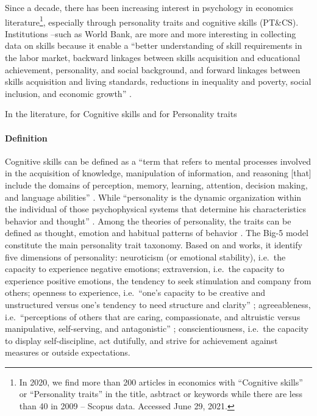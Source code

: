 \documentclass[a4paper, 11pt, onecolumn]{article}
\newcommand{\ie}{i.e.}
\begin{document}
Since a decade, there has been increasing interest in psychology in economics literature\footnote{In 2020, we find more than 200 articles in economics with ``Cognitive skills'' or ``Personality traits'' in the title, asbtract or keywords while there are less than 40 in 2009 -- Scopus data. Accessed June 29, 2021.}, especially through personality traits and cognitive skills (PT\&CS).
Institutions --such as World Bank, are more and more interesting in collecting data on skills because it enable a ``better understanding of skill requirements in the labor market, backward linkages between skills acquisition and educational achievement, personality, and social background, and forward linkages between skills acquisition and living standards, reductions in inequality and poverty, social inclusion, and economic growth'' \citep{STEP2014}.

In the literature, \cite{Hanushek2008} for Cognitive skills and \cite{Almlund2011, Borghans2008, Heckman2011} for Personality traits

\paragraph*{Definition}
Cognitive skills can be defined as a ``term that refers to mental processes involved in the acquisition of knowledge, manipulation of information, and reasoning [that] include the domains of perception, memory, learning, attention, decision making, and language abilities'' \citep{Kiely2014}.
While ``personality is the dynamic organization within the individual of those psychophysical systems that determine his characteristics behavior and thought'' \citep{Allport1961}.
Among the theories of personality, the traits can be defined as thought, emotion and habitual patterns of behavior \citep{Kassin2003}.
The Big-5 model constitute the main personality trait taxonomy.
Based on \cite{Goldberg1981} and \cite{McCrae1987} works, it identify five dimensions of personality: neuroticism (or emotional stability), \ie~the capacity to experience negative emotions; extraversion, \ie~the capacity to experience positive emotions, the tendency to seek stimulation and company from others; openness to experience, \ie~``one’s capacity to be creative and unstructured versus one’s tendency to need structure and clarity'' \citep{Piedmont2014}; agreeableness, \ie~``perceptions of others that are caring, compassionate, and altruistic versus manipulative, self-serving, and antagonistic'' \citep{Piedmont2014}; conscientiousness, \ie~the capacity to display self-discipline, act dutifully, and strive for achievement against measures or outside expectations.	
\end{document}
